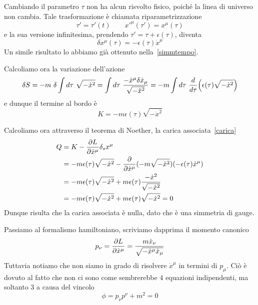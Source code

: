     Cambiando il parametro $\tau$ non ha alcun risvolto fisico, poiché la linea di universo non cambia. Tale trasformazione è chiamata riparametrizzazione
    \begin{equation*}
        \tau' = \tau'(t) \qquad x'^\mu (\tau') = x^\mu(\tau)
    \end{equation*} 
    e la sua versione infinitesima, prendendo $\tau' = \tau + \epsilon(\tau)$, diventa
    \begin{equation*}
        \delta x^\mu(\tau) = - \epsilon(\tau) \dot x^\mu
    \end{equation*}
    Un simile risultato lo abbiamo già ottenuto nella~\eqref{simmtempo}.
    
    Calcoliamo ora la variazione dell'azione 
    \begin{equation*}
        \delta S = - m ~ \delta \int d\tau ~ \sqrt{- \dot x^2} = \int d\tau ~ \frac{- \dot x^\mu \delta \dot x_\mu}{\sqrt{- \dot x^2}} = - m \int d\tau ~\frac{d}{d\tau} \Big ( \epsilon(\tau) \sqrt{- \dot x^2} \Big)
    \end{equation*}
    e dunque il termine al bordo è 
    \begin{equation*}
        K = - m \epsilon(\tau) \sqrt{- \dot x^2}
    \end{equation*}

    Calcoliamo ora attraverso il teorema di Noether, la carica associata~\eqref{carica}
    \begin{equation*}
    \begin{aligned}
        Q & = K - \frac{\partial L}{\partial\dot x^\mu} \delta_s x^\mu \\ & =  - m \epsilon(\tau) \sqrt{- \dot x^2} - \frac{\partial}{\partial\dot x^\mu} (- m \sqrt{- \dot x^2} ) (- \epsilon(\tau) \dot x^\mu) \\ & = - m \epsilon(\tau) \sqrt{- \dot x^2} + m \epsilon(\tau) \frac{- \dot x^2}{\sqrt{- \dot x^2}} \\ & = - m \epsilon(\tau) \sqrt{- \dot x^2} + m \epsilon(\tau) \sqrt{- \dot x^2} = 0
    \end{aligned}
    \end{equation*}
    Dunque risulta che la carica associata è nulla, dato che è una simmetria di gauge. 

    Passiamo al formalismo hamiltoniano, scriviamo dapprima il momento canonico 
\begin{equation*}
    p_\nu = \frac{\partial L}{\partial\dot x^\mu} = \frac{m \dot x_\nu}{\sqrt{- \dot x^\mu \dot x_\mu}}
\end{equation*}
    Tuttavia notiamo che non siamo in grado di risolvere $\dot x^\mu$ in termini di $p_\mu$. Ciò è dovuto al fatto che non ci sono come sembrerebbe 4 equazioni indipendenti, ma soltanto 3 a causa del vincolo 
\begin{equation*}
    \phi = p_\nu p^\nu + m^2 = 0
\end{equation*}

